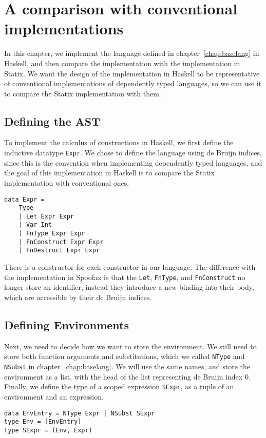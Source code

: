 \chapter{A comparison with conventional implementations}
\label{ch:comp-haskell}

In this chapter, we implement the language defined in chapter~\ref{chap:baselang} in Haskell, and then compare the implementation with the implementation in Statix. We want the design of the implementation in Haskell to be representative of conventional implementations of dependently typed languages, so we can use it to compare the Statix implementation with them.

\section{Defining the AST}
To implement the calculus of constructions in Haskell, we first define the inductive datatype \verb|Expr|. We chose to define the language using de Bruijn indices, since this is the convention when implementing dependently typed languages, and the goal of this implementation in Haskell is to compare the Statix implementation with conventional ones. 
\begin{lstlisting}
data Expr =
	Type
	| Let Expr Expr
	| Var Int
	| FnType Expr Expr
	| FnConstruct Expr Expr
	| FnDestruct Expr Expr
\end{lstlisting}
There is a constructor for each constructor in our language. The difference with the implementation in Spoofax is that the \verb|Let|, \verb|FnType|, and \verb|FnConstruct| no longer store an identifier, instead they introduce a new binding into their body, which are accessible by their de Bruijn indices. 

\section{Defining Environments}

Next, we need to decide how we want to store the environment. We still need to store both function arguments and substitutions, which we called \verb|NType| and \verb|NSubst| in chapter~\ref{chap:baselang}. We will use the same names, and store the environment as a list, with the head of the list representing de Bruijn index 0. Finally, we define the type of a scoped expression \verb|SExpr|, as a tuple of an environment and an expression.
\begin{lstlisting}
data EnvEntry = NType Expr | NSubst SExpr
type Env = [EnvEntry]
type SExpr = (Env, Expr)
\end{lstlisting}

